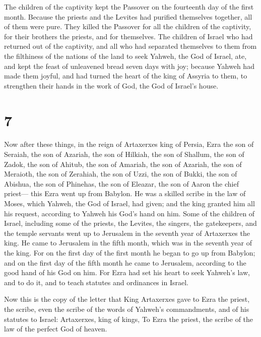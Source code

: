  The children of the captivity kept the Passover on the
fourteenth day of the first month.  Because the priests
and the Levites had purified themselves together, all of them were pure.
They killed the Passover for all the children of the captivity, for
their brothers the priests, and for themselves.  The
children of Israel who had returned out of the captivity, and all who
had separated themselves to them from the filthiness of the nations of
the land to seek Yahweh, the God of Israel, ate,  and
kept the feast of unleavened bread seven days with joy; because Yahweh
had made them joyful, and had turned the heart of the king of Assyria to
them, to strengthen their hands in the work of God, the God of Israel's
house.

\hypertarget{section-6}{%
\section{7}\label{section-6}}

 Now after these things, in the reign of Artaxerxes king
of Persia, Ezra the son of Seraiah, the son of Azariah, the son of
Hilkiah,  the son of Shallum, the son of Zadok, the son of
Ahitub,  the son of Amariah, the son of Azariah, the son
of Meraioth,  the son of Zerahiah, the son of Uzzi, the
son of Bukki,  the son of Abishua, the son of Phinehas,
the son of Eleazar, the son of Aaron the chief priest--- 
this Ezra went up from Babylon. He was a skilled scribe in the law of
Moses, which Yahweh, the God of Israel, had given; and the king granted
him all his request, according to Yahweh his God's hand on him.
 Some of the children of Israel, including some of the
priests, the Levites, the singers, the gatekeepers, and the temple
servants went up to Jerusalem in the seventh year of Artaxerxes the
king.  He came to Jerusalem in the fifth month, which was
in the seventh year of the king.  For on the first day of
the first month he began to go up from Babylon; and on the first day of
the fifth month he came to Jerusalem, according to the good hand of his
God on him.  For Ezra had set his heart to seek Yahweh's
law, and to do it, and to teach statutes and ordinances in Israel.

 Now this is the copy of the letter that King Artaxerxes
gave to Ezra the priest, the scribe, even the scribe of the words of
Yahweh's commandments, and of his statutes to Israel: 
Artaxerxes, king of kings, To Ezra the priest, the scribe of the law of
the perfect God of heaven.

